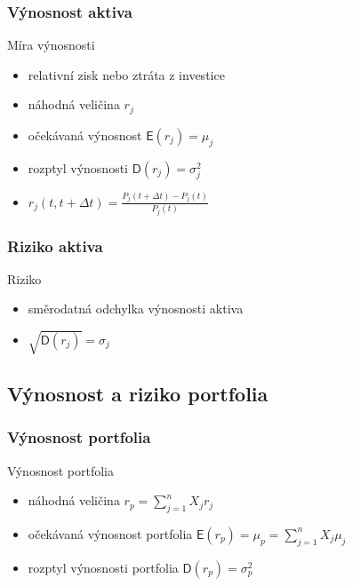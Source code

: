 \documentclass[xcolor=dvipsnames]{beamer}
\theoremstyle{definition} \newtheorem{definice}[veta]{Definice}
\theoremstyle{remark}
\begin{document}
\begin{frame}
  \frametitle{Výnosnost aktiva}
  \textcolor{OliveGreen}{Míra výnosnosti}
    \begin{itemize}
   \item relativní zisk nebo ztráta z investice
   \item náhodná veličina $r_j$
   \item očekávaná výnosnost $\mathsf{E}(r_j)=\mu_j$
   \item rozptyl výnosnosti $\mathsf{D}(r_j)=\sigma_j^2$
   \item $r_j(t,t+\Delta t)=\frac{P_j(t+\Delta t)-P_j(t)}{P_j(t)}$      
  \end{itemize}
\end{frame}
  
\begin{frame}
  \frametitle{Riziko aktiva}
  \textcolor{OliveGreen}{Riziko}
  \begin{itemize}
   \item směrodatná odchylka výnosnosti aktiva 
   \item $\sqrt{\mathsf{D}(r_j)}=\sigma_j$   
  \end{itemize}
\end{frame}

\subsection{Výnosnost a riziko portfolia}

\begin{frame}
 \frametitle{Výnosnost portfolia}

   \textcolor{OliveGreen}{Výnosnost portfolia}
   \begin{itemize}
    \item náhodná veličina $r_p=\sum_{j=1}^nX_jr_j$
    \item očekávaná výnosnost portfolia $\mathsf{E}(r_p)=\mu_p=\sum_{j=1}^nX_j\mu_j$
    \item rozptyl výnosnosti portfolia $\mathsf{D}(r_p)=\sigma_p^2$ 
  \end{itemize}
\end{frame}
\end{document}
